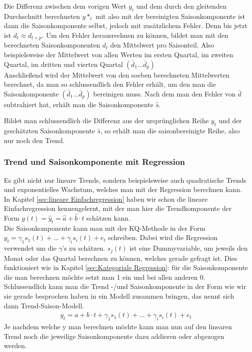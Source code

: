 \documentclass[a4paper]{article}
\begin{document}
Die Differenz zwischen dem vorigen Wert $y_t$ und dem durch den gleitenden Durchschnitt berechneten $y*_t$ mit also mit der bereinigten Saisonkomponente ist dann die Saisonkomponente selbst, jedoch mit zusätzlichem Fehler.
Denn bis jetzt ist $d_t\approx d_{t+p}$. 
Um den Fehler herausrechnen zu können, bildet man mit den berechneten Saisonkomponenten $d_t$ den Mittelwert pro Saisonteil. Also beispielsweise der Mittelwert von allen Werten im ersten Quartal, im zweiten Quartal, im dritten und vierten Quartal $(\bar{d}_1...\bar{d}_p)$ \\
Anschließend wird der Mittelwert von den soeben berechneten Mittelwerten berechnet, da man so schlussendlich den Fehler erhält, um den man die Saisonkomponente $(\bar{d}_1...\bar{d}_p)$ bereinigen muss. Nach dem man den Fehler von $\bar{d}$ subtrahiert hat, erhält man die Saisonkomponente $\hat{s}$.

Bildet man schlussendlich die Differenz aus der ursprünglichen Reihe $y_t$ und der geschätzten Saisonkomponente $\hat{s}$, so erhält man die saisonbereinigte Reihe, also nur noch den Trend.

\subsubsection{Trend und Saisonkomponente mit Regression}
Es gibt nicht nur lineare Trends, sondern beispielsweise auch quadratische Trends und exponentielles Wachstum, welches man mit der Regression berechnen kann.
In Kapitel \ref{sec:lineare Einfachregression} haben wir schon die lineare Einfachregression kennengelernt, mit der man hier die Trendkomponente der Form $g(t)=\hat{y}_t=\hat{a}+\hat{b}\cdot t$ schätzen kann.\\

\noindent Die Saisonkomponente kann man mit der KQ-Methode in der Form $y_t=\gamma_1s_1(t)+...+\gamma_{i}s_{i}(t)+e_t$ schreiben. Dabei wird die Regression verwendet um die $\gamma$'s zu schätzen. $s_j(t)$ ist eine Dummyvariable, um jeweils den Monat oder das Quartal berechnen zu können, welches gerade gefragt ist. Dies funktioniert wie in Kapitel \ref{sec:Kategoriale Regression}: für die Saisonkomponente die man berechnen möchte setzt man 1 ein und bei allen anderen 0.\\

\noindent Schlussendlich kann man die Trend -/und Saisonkomponente in der Form wie wir sie gerade besprochen haben in ein Modell zusammen bringen, das nennt sich dann Trend-Saison-Modell. 
\begin{align*}
    y_t=a+b\cdot t+\gamma_1s_1(t)+...+\gamma_{i}s_{i}(t)+e_t
\end{align*}
Je nachdem welche y man berechnen möchte kann man nun auf den linearen Trend noch die jeweilige Saisonkomponente dazu addieren oder abgezogen werden.
\end{document}
